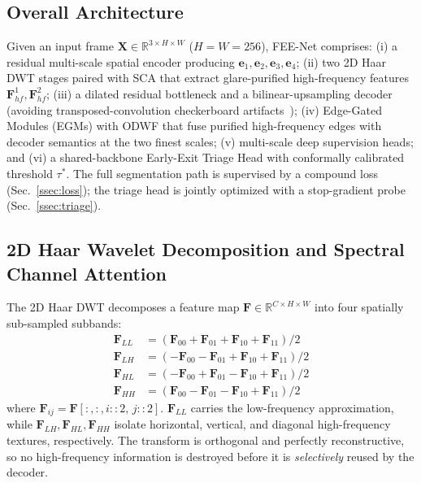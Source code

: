 \documentclass[journal]{IEEEtran}
\begin{document}
\subsection{Overall Architecture}
Given an input frame $\mathbf{X} \in \mathbb{R}^{3 \times H \times W}$ ($H{=}W{=}256$), FEE-Net comprises: (i) a residual multi-scale spatial encoder producing $\mathbf{e}_1,\mathbf{e}_2,\mathbf{e}_3,\mathbf{e}_4$; (ii) two 2D Haar DWT stages paired with SCA that extract glare-purified high-frequency features $\mathbf{F}_{hf}^{1},\mathbf{F}_{hf}^{2}$; (iii) a dilated residual bottleneck and a bilinear-upsampling decoder (avoiding transposed-convolution checkerboard artifacts~\cite{odena2016deconv}); (iv) Edge-Gated Modules (EGMs) with ODWF that fuse purified high-frequency edges with decoder semantics at the two finest scales; (v) multi-scale deep supervision heads; and (vi) a shared-backbone Early-Exit Triage Head with conformally calibrated threshold $\tau^{*}$. The full segmentation path is supervised by a compound loss (Sec.~\ref{ssec:loss}); the triage head is jointly optimized with a stop-gradient probe (Sec.~\ref{ssec:triage}).

\subsection{2D Haar Wavelet Decomposition and Spectral Channel Attention}
The 2D Haar DWT decomposes a feature map $\mathbf{F} \in \mathbb{R}^{C \times H \times W}$ into four spatially sub-sampled subbands:
\begin{align}
    \mathbf{F}_{LL} &= (\mathbf{F}_{00} + \mathbf{F}_{01} + \mathbf{F}_{10} + \mathbf{F}_{11})/2 \\
    \mathbf{F}_{LH} &= (-\mathbf{F}_{00} - \mathbf{F}_{01} + \mathbf{F}_{10} + \mathbf{F}_{11})/2 \\
    \mathbf{F}_{HL} &= (-\mathbf{F}_{00} + \mathbf{F}_{01} - \mathbf{F}_{10} + \mathbf{F}_{11})/2 \\
    \mathbf{F}_{HH} &= (\mathbf{F}_{00} - \mathbf{F}_{01} - \mathbf{F}_{10} + \mathbf{F}_{11})/2
\end{align}
where $\mathbf{F}_{ij} = \mathbf{F}[:,:,i{::}2,\,j{::}2]$. $\mathbf{F}_{LL}$ carries the low-frequency approximation, while $\mathbf{F}_{LH},\mathbf{F}_{HL},\mathbf{F}_{HH}$ isolate horizontal, vertical, and diagonal high-frequency textures, respectively. The transform is orthogonal and perfectly reconstructive, so no high-frequency information is destroyed before it is \emph{selectively} reused by the decoder.
\end{document}
